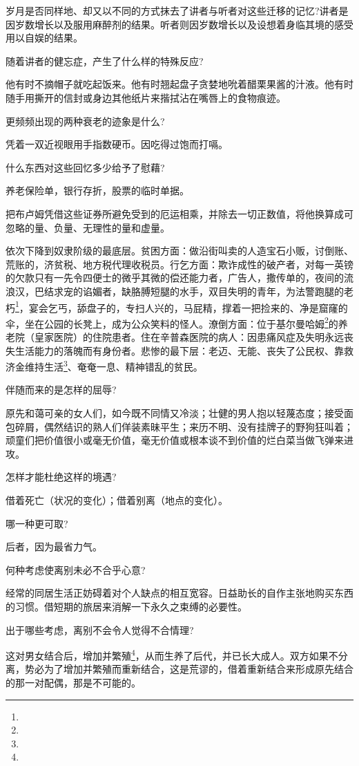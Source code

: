 \par 岁月是否同样地、却又以不同的方式抹去了讲者与听者对这些迁移的记忆?讲者是因岁数增长以及服用麻醉剂的结果。听者则因岁数增长以及设想着身临其境的感受用以自娱的结果。
\par 随着讲者的健忘症，产生了什么样的特殊反应?
\par 他有时不摘帽子就吃起饭来。他有时翘起盘子贪婪地吮着醋栗果酱的汁液。他有时随手用撕开的信封或身边其他纸片来揩拭沾在嘴唇上的食物痕迹。
\par 更频频出现的两种衰老的迹象是什么?
\par 凭着一双近视眼用手指数硬币。因吃得过饱而打嗝。
\par 什么东西对这些回忆多少给予了慰藉?
\par 养老保险单，银行存折，股票的临时单据。
\par 把布卢姆凭借这些证券所避免受到的厄运相乘，并除去一切正数值，将他换算成可忽略的量、负量、无理性的量和虚量。
\par 依次下降到奴隶阶级的最底层。贫困方面：做沿街叫卖的人造宝石小贩，讨倒账、荒账的，济贫税、地方税代理收税员。行乞方面：欺诈成性的破产者，对每一英镑的欠款只有一先令四便士的微乎其微的偿还能力者，广告人，撒传单的，夜间的流浪汉，巴结求宠的谄媚者，缺胳膊短腿的水手，双目失明的青年，为法警跑腿的老朽\footnote{}，宴会乞丐，舔盘子的，专扫人兴的，马屁精，撑着一把捡来的、净是窟窿的伞，坐在公园的长凳上，成为公众笑料的怪人。潦倒方面：位于基尔曼哈姆\footnote{}的养老院（皇家医院）的住院患者。住在辛普森医院的病人：因患痛风症及失明永远丧失生活能力的落魄而有身份者。悲惨的最下层：老迈、无能、丧失了公民权、靠救济金维持生活\footnote{}、奄奄一息、精神错乱的贫民。
\par 伴随而来的是怎样的屈辱?
\par 原先和蔼可亲的女人们，如今既不同情又冷淡；壮健的男人抱以轻蔑态度；接受面包碎屑，偶然结识的熟人们佯装素昧平生；来历不明、没有挂牌子的野狗狂叫着；顽童们把价值很小或毫无价值，毫无价值或根本谈不到价值的烂白菜当做飞弹来进攻。
\par 怎样才能杜绝这样的境遇?
\par 借着死亡（状况的变化）；借着别离（地点的变化）。
\par 哪一种更可取?
\par 后者，因为最省力气。
\par 何种考虑使离别未必不合乎心意?
\par 经常的同居生活正妨碍着对个人缺点的相互宽容。日益助长的自作主张地购买东西的习惯。借短期的旅居来消解一下永久之束缚的必要性。
\par 出于哪些考虑，离别不会令人觉得不合情理?
\par 这对男女结合后，增加并繁殖\footnote{}，从而生养了后代，并已长大成人。双方如果不分离，势必为了增加并繁殖而重新结合，这是荒谬的，借着重新结合来形成原先结合的那一对配偶，那是不可能的。
